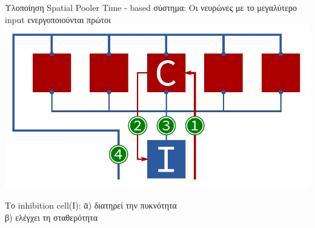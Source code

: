 \documentclass[11pt,center]{beamer}
\begin{document}
	\begin{frame}{Υλοποίηση Spatial Pooler}
		Time - based σύστημα: Οι νευρώνες με το μεγαλύτερο input ενεργοποιούνται πρώτοι\\
		\vspace{2em}
		\includegraphics[width=0.5 \textwidth,center]{../pics/spatial_hardware.jpg}
		\pause
		\vfill
		\begin{tabbing}
  			Το inhibition cell(I):  \= α) διατηρεί την πυκνότητα\\
  			\> β) ελέγχει τη σταθερότητα\\
  		\end{tabbing}
	\end{frame}
\end{document}

